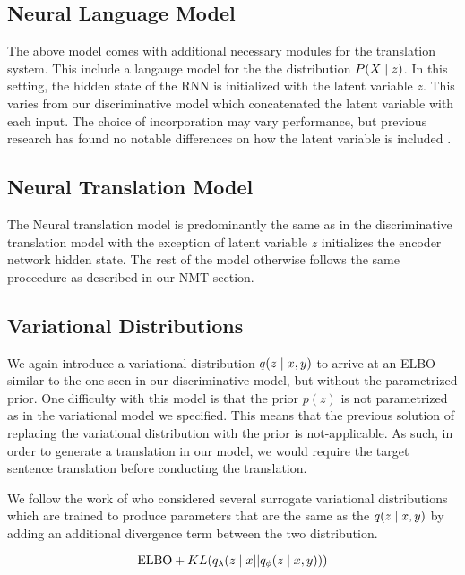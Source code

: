 \subsection{Neural Language Model}

The above model comes with additional necessary modules for the translation system. This include a langauge model for the the distribution $P(X \; | \;{z})$. In this setting, the hidden state of the \ac{RNN} is initialized with the latent variable $z$. This varies from our discriminative model which concatenated the latent variable with each input. The choice of incorporation may vary performance, but previous research has found no notable differences on how the latent variable is included \cite{bowman2015GeneratingSent}. 

\subsection{Neural Translation Model}

The Neural translation model is predominantly the same as in the discriminative translation model with the exception of latent variable $z$ 
initializes the encoder network hidden state. The rest of the model otherwise follows the same proceedure as described in our \ac{NMT} section. 
\subsection{Variational Distributions} 

We again introduce a variational distribution $q( z\; | \;{x, y})$ to arrive at an ELBO similar to the one seen in our discriminative model, but without the parametrized prior. One difficulty with this model is that the prior $p(z)$ is not parametrized as in the variational model we specified. This means that the previous solution of replacing the variational distribution with the prior is not-applicable. As such, in order to generate a translation in our model, we would require the target sentence translation before conducting the translation. 

We follow the work of \citet{eikema2018AEVNMT} who considered several surrogate variational distributions which are trained to produce parameters that are the same as the $q(z \; | \;{x, y})$ by adding an additional divergence term between the two distribution. 

\begin{equation}
\text{ELBO} + KL( q_{\lambda} (z \; | \;{x} || q_{\phi}(z \; | \;{x, y})))
\end{equation}

